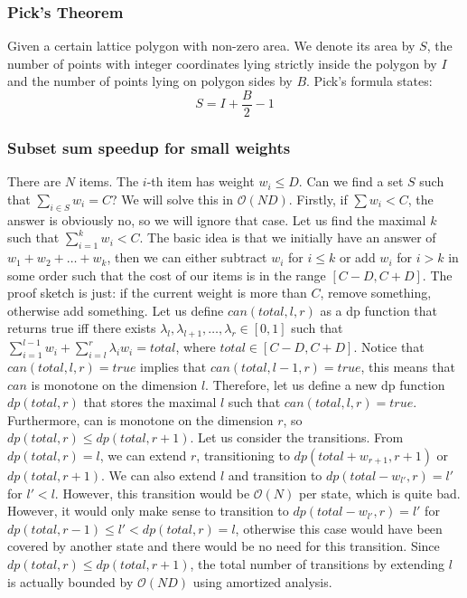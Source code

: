 \subsubsection{Pick's Theorem}
Given a certain lattice polygon with non-zero area.
We denote its area by $S$, the number of points with integer coordinates lying strictly inside the polygon by $I$ and the number of points lying on polygon sides by $B$.
Pick's formula states: $$S=I+\frac{B}{2}-1$$

\subsubsection{Subset sum speedup for small weights}
There are $N$ items. The $i$-th item has weight $w_i\leq D$. Can we find a set $S$ such that $\sum_{i\in S}w_i=C$?
We will solve this in $\mathcal{O}(ND)$. Firstly, if $\sum w_i<C$, the answer is obviously no, so we will ignore that case.
Let us find the maximal $k$ such that $\sum_{i=1}^{k}w_i<C$. The basic idea is that we initially have an answer of $w_1+w_2+\dots+w_k$, then we can either subtract $w_i$ for $i\leq k$ or add $w_i$ for $i>k$ in some order such that the cost of our items is in the range $[C-D,C+D]$. The proof sketch is just: if the current weight is more than $C$, remove something, otherwise add something.
Let us define $\mathit{can}(\mathit{total},l,r)$ as a dp function that returns true iff there exists $\lambda_l,\lambda_{l+1},\dots,\lambda_r \in [0,1]$ such that $\sum_{i=1}^{l-1}w_i+\sum_{i=l}^{r}\lambda_i w_i=\mathit{total}$, where $\mathit{total}\in[C-D,C+D]$.
Notice that $\mathit{can}(\mathit{total},l,r)=\mathit{true}$ implies that $\mathit{can}(\mathit{total},l-1,r)=\mathit{true}$, this means that $\mathit{can}$ is monotone on the dimension $l$. Therefore, let us define a new dp function $\mathit{dp}(\mathit{total},r)$ that stores the maximal $l$ such that $\mathit{can}(\mathit{total},l,r)=\mathit{true}$.
Furthermore, can is monotone on the dimension $r$, so $\mathit{dp}(\mathit{total},r)\leq \mathit{dp}(\mathit{total},r+1)$.
Let us consider the transitions.
From $\mathit{dp}(\mathit{total},r)=l$, we can extend $r$, transitioning to $\mathit{dp}(\mathit{total}+w_{r+1},r+1)$ or $\mathit{dp}(\mathit{total},r+1)$. We can also extend $l$ and transition to $\mathit{dp}(\mathit{total}-w_{l'},r)=l'$ for $l'<l$. However, this transition would be $\mathcal{O}(N)$ per state, which is quite bad.
However, it would only make sense to transition to $\mathit{dp}(\mathit{total}-w_{l'},r)=l'$ for $\mathit{dp}(\mathit{total},r-1)\leq l'<\mathit{dp}(\mathit{total},r)=l$, otherwise this case would have been covered by another state and there would be no need for this transition. Since $\mathit{dp}(\mathit{total},r)\leq \mathit{dp}(\mathit{total},r+1)$, the total number of transitions by extending $l$ is actually bounded by $\mathcal{O}(ND)$ using amortized analysis.

